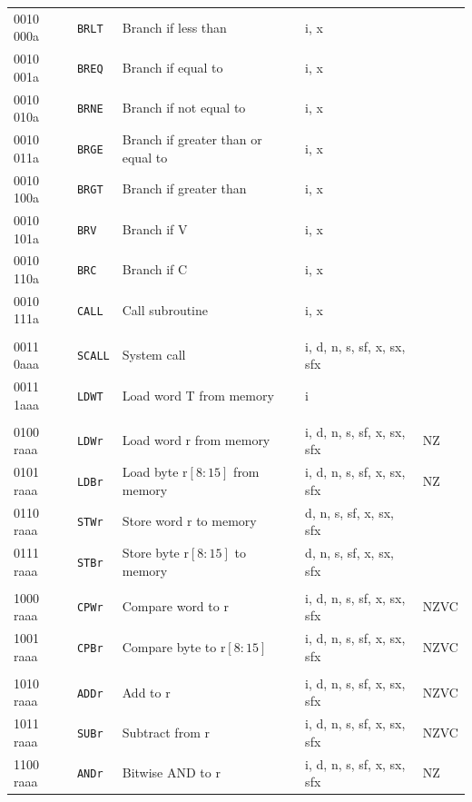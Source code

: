 \documentclass[10pt,fleqn]{book}
\begin{document}
\begin{tabular}{ l l l l l }
0010 000a   & \verb|BRLT|    & Branch if less than                  & i, x \\
0010 001a   & \verb|BREQ|    & Branch if equal to                   & i, x \\ 
0010 010a   & \verb|BRNE|    & Branch if not equal to               & i, x \\ 
0010 011a   & \verb|BRGE|    & Branch if greater than or equal to   & i, x \\ 
0010 100a   & \verb|BRGT|    & Branch if greater than               & i, x \\ 
0010 101a   & \verb|BRV|     & Branch if V                          & i, x \\ 
0010 110a   & \verb|BRC|     & Branch if C                          & i, x \\ 
0010 111a   & \verb|CALL|    & Call subroutine                      & i, x \\ 
 \\
0011 0aaa   & \verb|SCALL|   & System call                          & i, d, n, s, sf, x, sx, sfx \\
0011 1aaa   & \verb|LDWT|    & Load word T from memory              & i \\
 \\
0100 raaa   & \verb|LDWr|    & Load word r from memory              & i, d, n, s, sf, x, sx, sfx  & NZ \\
0101 raaa   & \verb|LDBr|    & Load byte r$[8:15]$ from memory      & i, d, n, s, sf, x, sx, sfx  & NZ \\
0110 raaa   & \verb|STWr|    & Store word r to memory               & d, n, s, sf, x, sx, sfx \\
0111 raaa   & \verb|STBr|    & Store byte r$[8:15]$ to memory       & d, n, s, sf, x, sx, sfx \\
\\
1000 raaa   & \verb|CPWr|    & Compare word to r                    & i, d, n, s, sf, x, sx, sfx  & NZVC \\
1001 raaa   & \verb|CPBr|    & Compare byte to r$[8:15]$            & i, d, n, s, sf, x, sx, sfx  & NZVC \\
 \\
1010 raaa   & \verb|ADDr|    & Add to r                             & i, d, n, s, sf, x, sx, sfx  & NZVC \\
1011 raaa   & \verb|SUBr|    & Subtract from r                      & i, d, n, s, sf, x, sx, sfx  & NZVC \\
1100 raaa   & \verb|ANDr|    & Bitwise AND to r                     & i, d, n, s, sf, x, sx, sfx  & NZ \\

\end{tabular}
\end{document}
